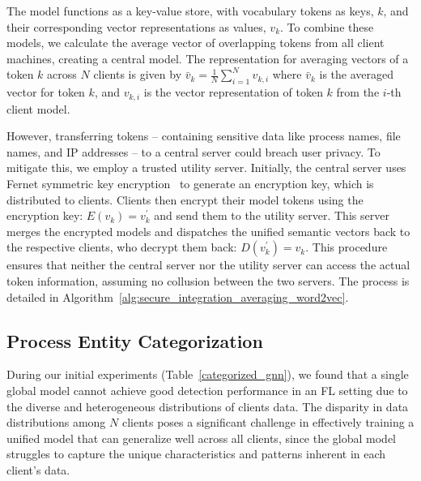 
The \wordvec model functions as a key-value store, with vocabulary tokens as keys, \(k\), and their corresponding vector representations as values, \(v_k\). To combine these models, we calculate the average vector of overlapping tokens from all client machines, creating a central model. The representation for averaging vectors of a token \(k\) across \(N\) clients is given by \(\bar{v}_k = \frac{1}{N}\sum_{i=1}^{N} v_{k,i}\) where \(\bar{v}_k\) is the averaged vector for token \(k\), and \(v_{k,i}\) is the vector representation of token \(k\) from the \(i\)-th client model.


 However, transferring tokens -- containing sensitive data like process names, file names, and IP addresses -- to a central server could breach user privacy. To mitigate this, we employ a trusted utility server. Initially, the central server uses Fernet symmetric key encryption~\cite{ismail2020fernet,bokhari2016review} to generate an encryption key, which is distributed to clients. Clients then encrypt their \wordvec model tokens using the encryption key: \( E(v_{k}) = v_{k}^{'} \) and send them to the utility server. This server merges the encrypted models and dispatches the unified semantic vectors back to the respective clients, who decrypt them back: \( D(v_{k}^{'}) = v_{k} \). This procedure ensures that neither the central server nor the utility server can access the actual token information, assuming no collusion between the two servers. The process is detailed in Algorithm~\ref{alg:secure_integration_averaging_word2vec}.



\subsection{Process Entity Categorization}
\label{sys:catg}

During our initial experiments (Table~\ref{categorized_gnn}), we found that a single \gnnshort global model cannot achieve good detection performance in an FL setting due to the diverse and heterogeneous distributions of clients data. The disparity in data distributions among \( N \) clients poses a significant challenge in effectively training a unified model that can generalize well across all clients, since the global model struggles to capture the unique characteristics and patterns inherent in each client's data.


